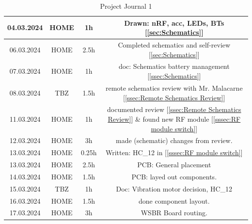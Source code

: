 \begin{table}[H]
\begin{tabular}{||c | c | c || c||}
 \hline
    04.03.2024 & HOME & 1h & Drawn: nRF, acc, LEDs, BTs [\ref{sec:Schematics}] \\ 
 \hline
    06.03.2024 & HOME & 2.5h & Completed schematics and self-review [\ref{sec:Schematics}] \\ 
 \hline
    07.03.2024 & HOME & 1h & doc: Schematics battery management [\ref{ssec:Schematics}] \\ 
 \hline
     08.03.2024 & TBZ & 1.5h & remote schematics review with Mr. Malacarne [\ref{ssec:Remote Schematics Review}] \\ 
 \hline
     11.03.2024 & HOME & 1h & documented review [\ref{ssec:Remote Schematics Review}] \& found new RF module [\ref{sssec:RF module switch}] \\ 
 \hline
     12.03.2024 & HOME & 3h & made (schematic) changes from review. \\ 
 \hline
     13.03.2024 & HOME & 0.25h & Written: HC\_12 in [\ref{sssec:RF module switch}] \\ 
 \hline
     13.03.2024 & HOME & 2.5h & PCB: General placement \\ 
 \hline
     14.03.2024 & HOME & 1.5h & PCB: layed out components. \\ 
 \hline
     15.03.2024 & TBZ & 1h & Doc: Vibration motor decision, HC\_12\\ 
 \hline
     16.03.2024 & HOME & 1.5h & done component layout. \\ 
 \hline
     17.03.2024 & HOME & 3h & WSBR Board routing. \\ 
 \hline
\end{tabular}
    \caption{Project Journal 1}
    \label{tab:Project Journal 1}
\end{table}
